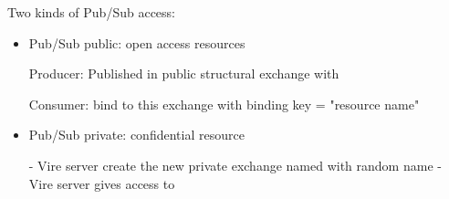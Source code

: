Two kinds of Pub/Sub access:

\begin{itemize}
\item Pub/Sub public: open access resources

  Producer:  Published in public structural exchange with

  Consumer: bind to this exchange with binding key = "resource name"

\item Pub/Sub private: confidential resource

  - Vire server create the new private exchange named
  with random name
  - Vire server gives access to

\end{itemize}
